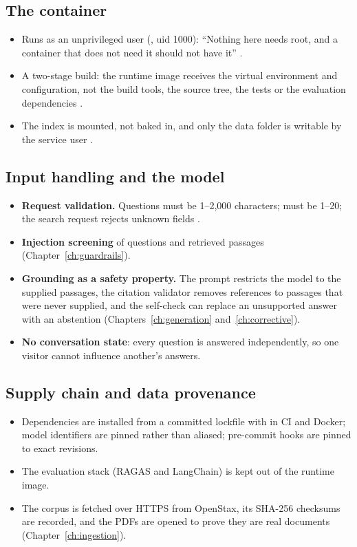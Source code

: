 \subsection{The container}

\begin{itemize}
  \item Runs as an unprivileged user (, uid 1000): \enquote{Nothing here needs root, and a container that does not need it should not have it} .
  \item A two-stage build: the runtime image receives the virtual environment and configuration, not the build tools, the source tree, the tests or the evaluation dependencies .
  \item The index is mounted, not baked in, and only the data folder is writable by the service user .
\end{itemize}

\subsection{Input handling and the model}

\begin{itemize}
  \item \textbf{Request validation.} Questions must be 1--2,000 characters;  must be 1--20; the search request rejects unknown fields .
  \item \textbf{Injection screening} of questions and retrieved passages (Chapter~\ref{ch:guardrails}).
  \item \textbf{Grounding as a safety property.} The prompt restricts the model to the supplied passages, the citation validator removes references to passages that were never supplied, and the self-check can replace an unsupported answer with an abstention (Chapters~\ref{ch:generation} and~\ref{ch:corrective}).
  \item \textbf{No conversation state}: every question is answered independently, so one visitor cannot influence another's answers.
\end{itemize}

\subsection{Supply chain and data provenance}

\begin{itemize}
  \item Dependencies are installed from a committed lockfile with  in CI and Docker; model identifiers are pinned rather than aliased; pre-commit hooks are pinned to exact revisions.
  \item The evaluation stack (RAGAS and LangChain) is kept out of the runtime image.
  \item The corpus is fetched over HTTPS from OpenStax, its SHA-256 checksums are recorded, and the PDFs are opened to prove they are real documents (Chapter~\ref{ch:ingestion}).
\end{itemize}

